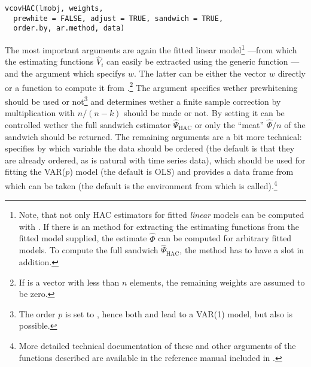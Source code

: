 \documentclass{Z}
\begin{document}
\begin{verbatim}
vcovHAC(lmobj, weights, 
  prewhite = FALSE, adjust = TRUE, sandwich = TRUE,
  order.by, ar.method, data)
\end{verbatim}

The most important arguments are again the fitted linear model\footnote{Note, that not only
HAC estimators for fitted \emph{linear} models can be computed with . If
there is an  method for extracting the estimating functions from the fitted
model supplied, the estimate $\hat \Phi$ can be computed for arbitrary fitted models. To compute 
the full sandwich $\hat \Psi_{\mathrm{HAC}}$, the  method has to 
have a slot  in addition.} ---from which
the estimating functions $\hat V_i$ can easily be extracted using the generic
function ---and the argument  which specifys $w$.
The latter can be either the vector $w$ directly or a function to compute it from
.\footnote{If  is a vector with less than $n$ elements, the remaining
weights are assumed to be zero.} The argument  specifies wether 
prewhitening should be used or not\footnote{The order $p$ is set to
, hence both  and 
lead to a VAR(1) model, but also  is possible.}
and  determines wether a finite sample
correction by multiplication with $n/(n-k)$ should be made or not. By setting
 it can be controlled wether the full sandwich estimator 
$\hat \Psi_{\mathrm{HAC}}$ or only the ``meat'' $\hat \Phi/n$ of the sandwich should
be returned. The remaining arguments are a bit more technical: 
specifies by which variable the data should be ordered (the default is that they 
are already ordered, as is natural with time series data), which 
should be used for fitting the VAR($p$) model (the default is OLS) and 
provides a data frame from which  can be taken (the default is the
environment from which  is called).\footnote{More detailed technical documentation
of these and other arguments of the functions described are
available in the reference manual included in .}
\end{document}
